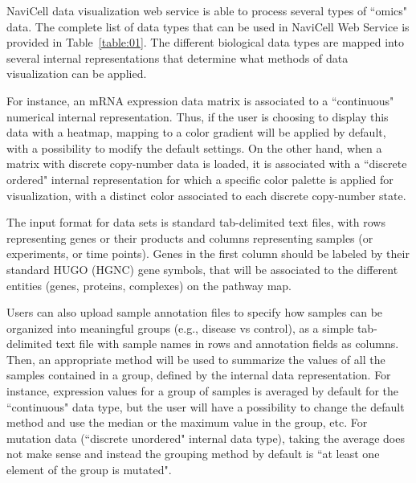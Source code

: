 \documentclass[a4,center,fleqn]{NAR}
\begin{document}
NaviCell data visualization web service is able to process
several types of ``omics" data. The complete list of data types that can be used in NaviCell Web Service
is provided in Table~\ref{table:01}. The different biological data
types are mapped into several internal representations that determine what methods
of data visualization can be applied.

For instance, an mRNA expression data matrix is associated to a
``continuous" numerical internal representation. Thus, if the user is choosing to display
this data with a heatmap, mapping to a color gradient will be applied by default, with a possibility
to modify the default settings. On the other hand, when a
matrix with discrete copy-number data is loaded, it is associated with a
``discrete ordered" internal representation for which
a specific color palette is applied for visualization,
with a distinct color associated to each discrete copy-number state.

The input format for data sets is standard tab-delimited text files, with rows
representing genes or their products and columns representing samples (or experiments, or time
points). Genes in the first column should be labeled by their standard HUGO (HGNC)
gene symbols, that will be associated to the different entities (genes,
proteins, complexes) on the pathway map.

Users can also upload sample annotation files to specify how samples can be organized into meaningful groups
(e.g., disease vs control), as a simple tab-delimited text file with sample names in
rows and annotation fields as columns. Then, an appropriate method will be used
to summarize the values of all the samples contained in a group, defined by the
internal data representation. For instance, expression values for a group of samples
is averaged by default for the ``continuous" data type, but the user will have
a possibility to change the default method and use the median or
the maximum value in the group, etc. For mutation data (``discrete unordered" internal data type),
taking the average does not make sense and instead the grouping method by default is
``at least one element of the group is mutated".
\end{document}
